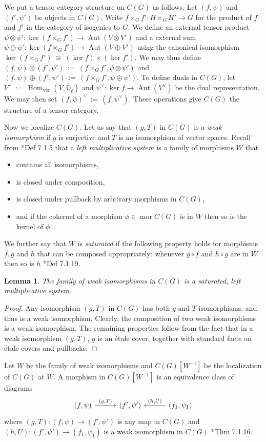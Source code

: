 \documentclass{amsart}
\theoremstyle{plain}
\newtheorem{lemma}[theorem]{Lemma}
\theoremstyle{definition}
\theoremstyle{remark}
\newcommand{\EE}{\mathbb{\bar Q}_\ell}
\DeclareMathOperator{\Aut}{Aut}
\DeclareMathOperator{\Hom}{Hom}
\DeclareMathOperator{\mor}{mor}
\newcommand{\ceq}{{\, :=\, }}
\newcommand{\iso}{{\ \cong\ }}
\begin{document}
We put a tensor category structure on $C(G)$ as follows.
Let $(f,\psi)$ and $(f',\psi')$ be objects in $C(G)$. 
Write $f\times_G f' : H\times_G H' \to G$ for the product of $f$ and $f'$
in the category of isogenies to $G$. We define an external tensor product
$\psi \otimes\psi' :  \ker(f\times_G f') \to \Aut(V\otimes V')$ and a external sum
$\psi \oplus\psi' :  \ker(f\times_G f') \to \Aut(V\oplus V')$
using the canonical isomorphism $\ker(f\times_G f') \iso (\ker f)\times (\ker f')$.
We may thus define $(f,\psi)\otimes(f',\psi') \ceq (f\times_G f' ,\psi\otimes\psi')$ and
$(f,\psi)\oplus(f',\psi')\ceq (f\times_G f' ,\psi\oplus\psi')$. To define duals in $C(G)$,
let $V^\vee \ceq \Hom_\text{vec}(V,\EE)$ and $\psi^\vee : \ker f \to \Aut(V^\vee)$ be
the dual representation.  We may then set $(f,\psi)^\vee \ceq (f,\psi^\vee)$.
These operations give $C(G)$ the structure of a tensor category.

Now we localize $C(G)$.
Let us say that $(g,T)$ in $C(G)$ is a \emph{weak isomorphism} if $g$ is surjective
and $T$ is an isomorphism of vector spaces.  Recall from
\cite{kashiwara-schapira:CatgoriesSheaves}*{Def 7.1.5} that a \emph{left multiplicative system}
is a family of morphisms $W$ that
\begin{itemize}
\item contains all isomorphisms,
\item is closed under composition,
\item is closed under pullback by arbitrary morphisms in $C(G)$,
\item and if the cokernel of a morphism $\phi \in \mor C(G)$ is in
$W$ then so is the kernel of $\phi$.
\end{itemize}

We further say that $W$ is \emph{saturated} if the following property holds for
morphisms $f, g$ and $h$ that can be composed appropriately:
whenever $g \circ f$ and $h \circ g$ are in $W$ then so is $h$
\cite{kashiwara-schapira:CatgoriesSheaves}*{Def 7.1.19}.

\begin{lemma}
The family of weak isomorphisms in $C(G)$ is a saturated, left multiplicative system.
\end{lemma}
\begin{proof}
Any isomorphism $(g, T)$ in $C(G)$ has both $g$ and $T$ isomorphisms, and thus is a weak isomorphism.
Clearly, the composition of two weak isomorphisms is a weak isomorphism.  The remaining properties
follow from the fact that in a weak isomorphism $(g, T)$, $g$ is an \'etale cover, together with standard
facts on \'etale covers and pullbacks.
\end{proof}
Let $W$ be the family of weak isomorphisms and $C(G)[W^{-1}]$ be the localization of $C(G)$ at $W$.
A morphism in $C(G)[W^{-1}]$ is an equivalence class of diagrams
\[   
\begin{tikzcd}[column sep=30]
   (f,\psi) \arrow{r}{(g,T)} & (f',\psi') & \arrow[swap]{l}{(h,U)} (f_1,\psi_1)
   \end{tikzcd}
\]
 where $(g,T) : (f,\psi) \to (f',\psi')$ is any map in $C(G)$ 
 and $(h,U) :  (f',\psi') \to (f_1,\psi_1)$ is a weak isomorphism in $C(G)$ \cite{kashiwara-schapira:CatgoriesSheaves}*{Thm 7.1.16}.
\end{document}
